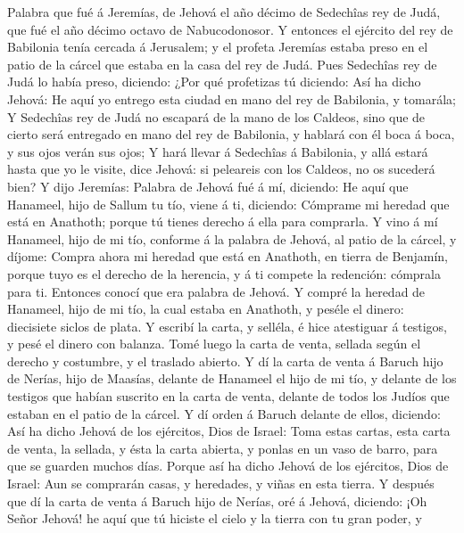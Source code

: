  Palabra que fué á Jeremías, de Jehová el año décimo de
Sedechîas rey de Judá, que fué el año décimo octavo de Nabucodonosor.
 Y entonces el ejército del rey de Babilonia tenía cercada á
Jerusalem; y el profeta Jeremías estaba preso en el patio de la cárcel
que estaba en la casa del rey de Judá.  Pues Sedechîas rey
de Judá lo había preso, diciendo: ¿Por qué profetizas tú diciendo: Así
ha dicho Jehová: He aquí yo entrego esta ciudad en mano del rey de
Babilonia, y tomarála;  Y Sedechîas rey de Judá no escapará
de la mano de los Caldeos, sino que de cierto será entregado en mano del
rey de Babilonia, y hablará con él boca á boca, y sus ojos verán sus
ojos;  Y hará llevar á Sedechîas á Babilonia, y allá estará
hasta que yo le visite, dice Jehová: si peleareis con los Caldeos, no os
sucederá bien?  Y dijo Jeremías: Palabra de Jehová fué á mí,
diciendo:  He aquí que Hanameel, hijo de Sallum tu tío,
viene á ti, diciendo: Cómprame mi heredad que está en Anathoth; porque
tú tienes derecho á ella para comprarla.  Y vino á mí
Hanameel, hijo de mi tío, conforme á la palabra de Jehová, al patio de
la cárcel, y díjome: Compra ahora mi heredad que está en Anathoth, en
tierra de Benjamín, porque tuyo es el derecho de la herencia, y á ti
compete la redención: cómprala para ti. Entonces conocí que era palabra
de Jehová.  Y compré la heredad de Hanameel, hijo de mi tío,
la cual estaba en Anathoth, y peséle el dinero: diecisiete siclos de
plata.  Y escribí la carta, y selléla, é hice atestiguar á
testigos, y pesé el dinero con balanza.  Tomé luego la
carta de venta, sellada según el derecho y costumbre, y el traslado
abierto.  Y dí la carta de venta á Baruch hijo de Nerías,
hijo de Maasías, delante de Hanameel el hijo de mi tío, y delante de los
testigos que habían suscrito en la carta de venta, delante de todos los
Judíos que estaban en el patio de la cárcel.  Y dí orden á
Baruch delante de ellos, diciendo:  Así ha dicho Jehová de
los ejércitos, Dios de Israel: Toma estas cartas, esta carta de venta,
la sellada, y ésta la carta abierta, y ponlas en un vaso de barro, para
que se guarden muchos días.  Porque así ha dicho Jehová de
los ejércitos, Dios de Israel: Aun se comprarán casas, y heredades, y
viñas en esta tierra.  Y después que dí la carta de venta á
Baruch hijo de Nerías, oré á Jehová, diciendo:  ¡Oh Señor
Jehová! he aquí que tú hiciste el cielo y la tierra con tu gran poder, y
